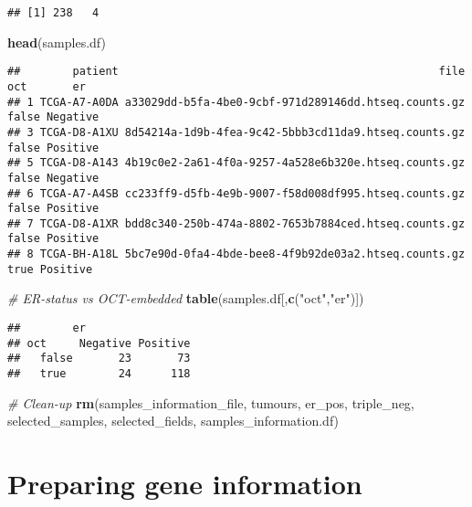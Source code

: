 \documentclass[]{book}
\newenvironment{Shaded}{\begin{snugshade}}{\end{snugshade}}
\newcommand{\KeywordTok}[1]{\textcolor[rgb]{0.13,0.29,0.53}{\textbf{#1}}}
\newcommand{\StringTok}[1]{\textcolor[rgb]{0.31,0.60,0.02}{#1}}
\newcommand{\CommentTok}[1]{\textcolor[rgb]{0.56,0.35,0.01}{\textit{#1}}}
\newcommand{\NormalTok}[1]{#1}
\begin{document}
\begin{verbatim}
## [1] 238   4
\end{verbatim}

\begin{Shaded}
\begin{Highlighting}[]
\KeywordTok{head}\NormalTok{(samples.df)}
\end{Highlighting}
\end{Shaded}

\begin{verbatim}
##        patient                                                 file   oct       er
## 1 TCGA-A7-A0DA a33029dd-b5fa-4be0-9cbf-971d289146dd.htseq.counts.gz false Negative
## 3 TCGA-D8-A1XU 8d54214a-1d9b-4fea-9c42-5bbb3cd11da9.htseq.counts.gz false Positive
## 5 TCGA-D8-A143 4b19c0e2-2a61-4f0a-9257-4a528e6b320e.htseq.counts.gz false Negative
## 6 TCGA-A7-A4SB cc233ff9-d5fb-4e9b-9007-f58d008df995.htseq.counts.gz false Positive
## 7 TCGA-D8-A1XR bdd8c340-250b-474a-8802-7653b7884ced.htseq.counts.gz false Positive
## 8 TCGA-BH-A18L 5bc7e90d-0fa4-4bde-bee8-4f9b92de03a2.htseq.counts.gz  true Positive
\end{verbatim}

\begin{Shaded}
\begin{Highlighting}[]
\CommentTok{# ER-status vs OCT-embedded }
\KeywordTok{table}\NormalTok{(samples.df[,}\KeywordTok{c}\NormalTok{(}\StringTok{"oct"}\NormalTok{,}\StringTok{"er"}\NormalTok{)])}
\end{Highlighting}
\end{Shaded}

\begin{verbatim}
##        er
## oct     Negative Positive
##   false       23       73
##   true        24      118
\end{verbatim}

\begin{Shaded}
\begin{Highlighting}[]
\CommentTok{# Clean-up}
\KeywordTok{rm}\NormalTok{(samples_information_file, tumours, er_pos, triple_neg, selected_samples, selected_fields, samples_information.df)}
\end{Highlighting}
\end{Shaded}

\chapter{Preparing gene information}\label{preparing-gene-information}
\end{document}
